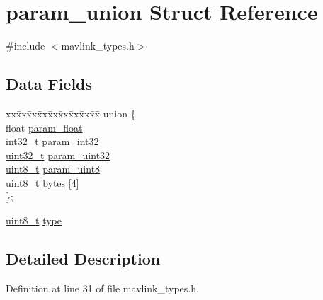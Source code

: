 \hypertarget{structparam__union}{\section{param\-\_\-union Struct Reference}
\label{structparam__union}
}


{\ttfamily \#include $<$mavlink\-\_\-types.\-h$>$}

\subsection*{Data Fields}
\begin{DoxyCompactItemize}
\item 
\begin{tabbing}
xx\=xx\=xx\=xx\=xx\=xx\=xx\=xx\=xx\=\kill
union \{\\
\>float \hyperlink{structparam__union_afcfa880ccb1ace3c6a26e2bf008563aa}{param\_float}\\
\>\hyperlink{group___n_a_m_e_gafd12020da5a235dfcf0c3c748fb5baed}{int32\_t} \hyperlink{structparam__union_a30808fc70851f9723566285dce61a336}{param\_int32}\\
\>\hyperlink{stdint_8h_a435d1572bf3f880d55459d9805097f62}{uint32\_t} \hyperlink{structparam__union_a67c8edafdce53186bd16154cdbe1d736}{param\_uint32}\\
\>\hyperlink{stdint_8h_aba7bc1797add20fe3efdf37ced1182c5}{uint8\_t} \hyperlink{structparam__union_ad3e573e92099cb9f0cfabf556a6c99a7}{param\_uint8}\\
\>\hyperlink{stdint_8h_aba7bc1797add20fe3efdf37ced1182c5}{uint8\_t} \hyperlink{structparam__union_a2a806761f2869448bb842d1dc78e1c74}{bytes} \mbox{[}4\mbox{]}\\
\}; \\

\end{tabbing}\item 
\hyperlink{stdint_8h_aba7bc1797add20fe3efdf37ced1182c5}{uint8\-\_\-t} \hyperlink{structparam__union_a931bfe7edb069e632613635165968af6}{type}
\end{DoxyCompactItemize}


\subsection{Detailed Description}


Definition at line 31 of file mavlink\-\_\-types.\-h.



